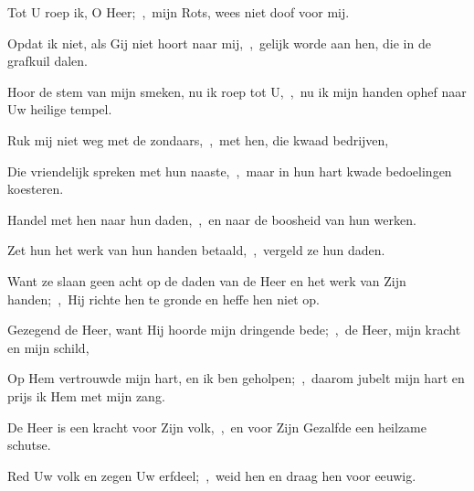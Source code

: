 \documentclass[12pt,twoside,a5paper]{article}
\begin{document}




\begin{halfparskip}
  Tot U roep ik, O Heer;~\sep\ mijn Rots, wees niet doof voor mij.

  Opdat ik niet, als Gij niet hoort naar mij,~\sep\ gelijk worde aan hen, die in de grafkuil dalen.


  Hoor de stem van mijn smeken, nu ik roep tot U,~\sep\ nu ik mijn handen ophef naar Uw heilige tempel.

  Ruk mij niet weg met de zondaars,~\sep\ met hen, die kwaad bedrijven,

  Die vriendelijk spreken met hun naaste,~\sep\ maar in hun hart kwade bedoelingen koesteren.

  Handel met hen naar hun daden,~\sep\ en naar de boosheid van hun werken.

  Zet hun het werk van hun handen betaald,~\sep\ vergeld ze hun daden.

  Want ze slaan geen acht op de daden van de Heer en het werk van Zijn handen;~\sep\ Hij richte hen te gronde en heffe hen niet op.
\end{halfparskip}


\begin{halfparskip}
  Gezegend de Heer, want Hij hoorde mijn dringende bede;~\sep\ de Heer, mijn kracht en mijn schild,

  Op Hem vertrouwde mijn hart, en ik ben geholpen;~\sep\ daarom jubelt mijn hart en prijs ik Hem met mijn zang.

  De Heer is een kracht voor Zijn volk,~\sep\ en voor Zijn Gezalfde een heilzame schutse.

  Red Uw volk en zegen Uw erfdeel;~\sep\ weid hen en draag hen voor eeuwig.
\end{halfparskip}

\end{document}

